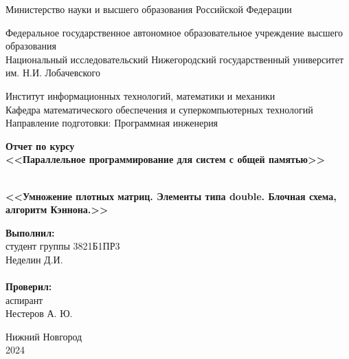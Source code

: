 \documentclass{report}
\begin{document}
\begin{titlepage}

\begin{center}
Министерство науки и высшего образования Российской Федерации
\end{center}

\begin{center}
Федеральное государственное автономное образовательное учреждение высшего образования \\
Национальный исследовательский Нижегородский государственный университет \newline им. Н.И. Лобачевского
\end{center}

\begin{center}
Институт информационных технологий, математики и механики \\
Кафедра математического обеспечения и суперкомпьютерных технологий \\
Направление подготовки: Программная инженерия
\end{center}

\begin{center}
\textbf{Отчет по курсу \\
\vspace{0.5em}
<<Параллельное программирование для систем с общей памятью>>} \\
\end{center}

\vspace{4em}

\begin{center}
\textbf{ \\
\vspace{0.5em}
<<Умножение плотных матриц. Элементы типа double. Блочная схема, алгоритм Кэннона.>>} \\
\end{center}

\vspace{4em}

\newbox{\lbox}
\newlength{\maxl}
\setlength{\maxl}{\wd\lbox}
\hfill\parbox{7cm}{
\hspace*{5cm}\hspace*{-5cm}\textbf{Выполнил:} \\ студент группы 3821Б1ПР3\\Неделин Д.И.\\
\\
\hspace*{5cm}\hspace*{-5cm}\textbf{Проверил:}\\ аспирант\\Нестеров А. Ю.\\
}
\vspace{\fill}

\begin{center} Нижний Новгород \\ 2024 \end{center}

\end{titlepage}
\end{document}
